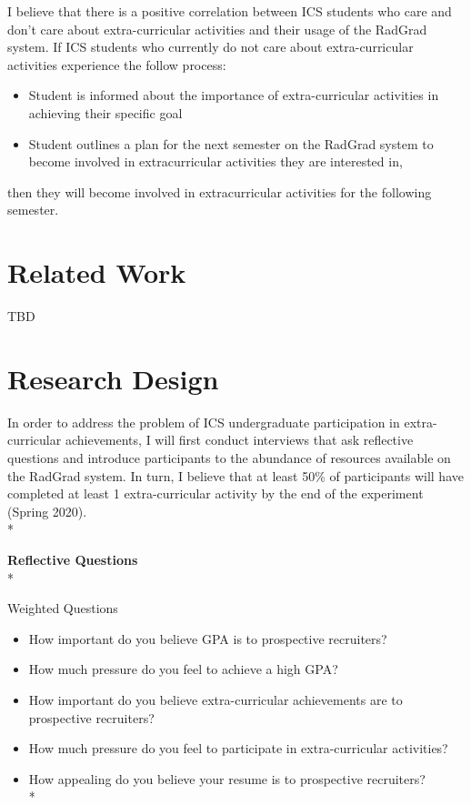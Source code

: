 \documentclass[english]{proposalnsf}
\begin{document}
  I believe that there is a positive correlation between ICS students who care and don't care about extra-curricular activities and their usage of the RadGrad system.
  If ICS students who currently do not care about extra-curricular activities experience the follow process:
  \begin{itemize}
    \item Student is informed about the importance of extra-curricular activities in achieving their specific goal
    \item Student outlines a plan for the next semester on the RadGrad system to become involved in extracurricular activities they are interested in,
  \end{itemize}
  then they will become involved in extracurricular activities for the following semester.

  \section{Related Work}
  \label{related-work}

  TBD

  \section{Research Design}
  \label{research-design}

  In order to address the problem of ICS undergraduate participation in extra-curricular achievements, I will first conduct interviews that ask reflective questions and introduce participants to the abundance of resources available on the RadGrad system.
  In turn, I believe that at least 50\% of participants will have completed at least 1 extra-curricular activity by the end of the experiment (Spring 2020).\\*

  \textbf{Reflective Questions}\\*

  Weighted Questions
  \begin{itemize}
    \item How important do you believe GPA is to prospective recruiters?
    \item How much pressure do you feel to achieve a high GPA?
    \item How important do you believe extra-curricular achievements are to prospective recruiters?
    \item How much pressure do you feel to participate in extra-curricular activities?
    \item How appealing do you believe your resume is to prospective recruiters?\\*
  \end{itemize}
\end{document}
